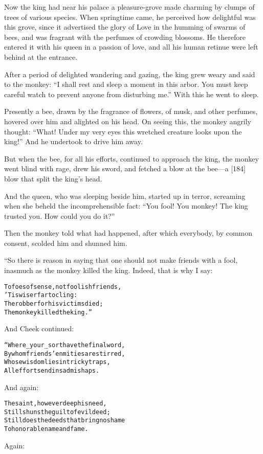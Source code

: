 \documentclass{article}
\renewenvironment{verbatim}{\begin{alltt}\normalfont\begin{centering}}{\end{centering}\end{alltt}}
\begin{document}
Now the king had near his palace a pleasure-grove made charming by
clumps of trees of various species. When springtime came, he
perceived how delightful was this grove, since it advertised the
glory of Love in the humming of swarms of bees, and was fragrant
with the perfumes of crowding blossoms. He therefore entered it
with his queen in a passion of love, and all his human retinue were
left behind at the entrance.

After a period of delighted wandering and gazing, the king grew
weary and said to the monkey:
``I shall rest and sleep a moment in this arbor. You must keep careful watch to prevent anyone from disturbing me.''
With this he went to sleep.

Presently a bee, drawn by the fragrance of flowers, of musk, and
other perfumes, hovered over him and alighted on his head. On
seeing this, the monkey angrily thought:
``What! Under my very eyes this wretched creature looks upon the king!''
And he undertook to drive him away.

But when the bee, for all his efforts, continued to approach the
king, the monkey went blind with rage, drew his sword, and fetched
a blow at the bee---a [184] blow that split the king's head.

And the queen, who was sleeping beside him, started up in terror,
screaming when she beheld the incomprehensible fact:
``You fool! You monkey! The king trusted you. How could you do it?''

Then the monkey told what had happened, after which everybody, by
common consent, scolded him and shunned him.

“So there is reason in saying that one should not make friends with
a fool, inasmuch as the monkey killed the king. Indeed, that is why
I say:

\begin{verbatim}
To foes of sense, not foolish friends,
    'Tis wiser far to cling:
The robber for his victims died;
    The monkey killed the king.”
\end{verbatim}
And Cheek continued:

\begin{verbatim}
“Where _your_ sort have the final word,
By whom friends' enmities are stirred,
Whose wisdom lies in tricky traps,
All efforts end in sad mishaps.
\end{verbatim}
And again:

\begin{verbatim}
The saint, however deep his need,
Still shuns the guilt of evil deed;
Still does the deeds that bring no shame
To honorable name and fame.
\end{verbatim}
Again:
\end{document}
